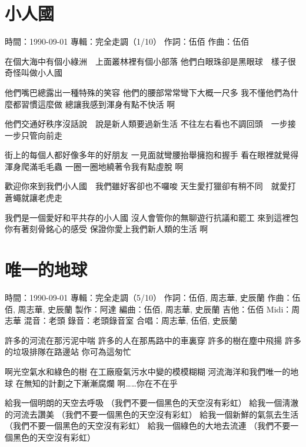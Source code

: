 \documentclass[UTF8,a4paper,oneside,twocolumn,12pt]{ctexbook}
\newcommand{\infopair}[2]{\textbullet #1：#2}
\newcommand{\zc}[1][伍佰]{\infopair{作詞}{#1}}
\newcommand{\zq}[1][伍佰]{\infopair{作曲}{#1}}
\newcommand{\bq}[1][伍佰]{\infopair{編曲}{#1}}
\newcommand{\zj}[1]{\infopair{專輯}{#1}}
\newcommand{\zz}[1]{\infopair{製作}{#1}}
\newcommand{\sj}[1]{\infopair{時間}{#1}}
\newenvironment{info}{\begin{flushleft}\kaishu
	}
	{\end{flushleft}\normalsize\yahei\par}
\newenvironment{lyric}{
	}
{}
\begin{document}
\section{小人國}
\begin{info}
	\sj{1990-09-01}
	\zj{完全走調（1/10）}
	\zc
	\zq
\end{info}
\begin{lyric}
	在個大海中有個小綠洲　上面叢林裡有個小部落
	他們白眼珠卻是黑眼球　樣子很奇怪叫做小人國

	他們嘴巴總露出一種特殊的笑容
	他們的腰部常常彎下大概一尺多
	我不懂他們為什麼都習慣這麼做
	總讓我感到渾身有點不快活 啊

	他們交通好秩序沒話說　說是新人類要過新生活
	不往左右看也不調回頭　一步接一步只管向前走

	街上的每個人都好像多年的好朋友
	一見面就彎腰抬舉擁抱和握手
	看在眼裡就覺得渾身爬滿毛毛蟲
	一圈一圈地繞著令我有點虛脫 啊

	歡迎你來到我們小人國　我們雖好客卻也不囉唆
	天生愛打獵卻有稍不同　就愛打蒼蠅就讓老虎走

	我們是一個愛好和平共存的小人國
	沒人會管你的無聊遊行抗議和罷工
	來到這裡包你有著刻骨銘心的感受
	保證你愛上我們新人類的生活 啊
\end{lyric}

\section{唯一的地球}
\begin{info}
	\sj{1990-09-01}
	\zj{完全走調（5/10）}
	\zc[伍佰, 周志華, 史辰蘭]
	\zq[伍佰, 周志華, 史辰蘭]
	\zz{阿達}
	\bq[伍佰, 周志華, 史辰蘭]
	\infopair{吉他}{伍佰}
	\infopair{Midi}{周志華}
	\infopair{混音}{老頭}
	\infopair{錄音}{老頭錄音室}
	\infopair{合唱}{周志華, 伍佰, 史辰蘭}
\end{info}
\begin{lyric}
	許多的河流在那污泥中喘
	許多的人在那馬路中的車裏穿
	許多的樹在塵中飛揚
	許多的垃圾排隊在路邊站
	你可為這匆忙

	啊光空氣水和綠色的樹
	在工廠廢氣污水中變的模模糊糊
	河流海洋和我們唯一的地球
	在無知的計劃之下漸漸腐爛
	啊……你在不在乎

	給我一個明朗的天空去呼吸 （我們不要一個黑色的天空沒有彩虹）
	給我一個淸澈的河流去讚美 （我們不要一個黑色的天空沒有彩虹）
	給我一個新鮮的氣氛去生活 （我們不要一個黑色的天空沒有彩虹）
	給我一個綠色的大地去流連 （我們不要一個黑色的天空沒有彩虹）
\end{lyric}
\end{document}

